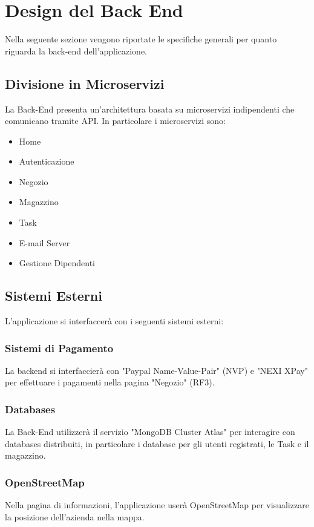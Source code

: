 \documentclass{report}
\begin{document}
\section{Design del Back End}

Nella seguente sezione vengono riportate le specifiche generali per quanto riguarda la back-end dell’applicazione.

\subsection{Divisione in Microservizi}

La Back-End presenta un’architettura basata su microservizi indipendenti che comunicano tramite API. In particolare i microservizi sono:
\begin{itemize}
	\item Home
	\item Autenticazione
	\item Negozio
	\item Magazzino
	\item Task
	\item E-mail Server
	\item Gestione Dipendenti
\end{itemize}

\subsection{Sistemi Esterni}
L’applicazione si interfaccerà con i seguenti sistemi esterni:

\subsubsection{Sistemi di Pagamento}
La backend si interfaccierà con "Paypal Name-Value-Pair" (NVP) e "NEXI XPay" per effettuare i pagamenti nella pagina "Negozio" (RF3). 

\subsubsection{Databases}
La Back-End utilizzerà il servizio "MongoDB Cluster Atlas" per interagire con databases distribuiti, in particolare i database per gli utenti registrati, le Task e il magazzino.

\subsubsection{OpenStreetMap}
Nella pagina di informazioni, l'applicazione userà OpenStreetMap per visualizzare la posizione dell'azienda nella mappa.
\end{document}
